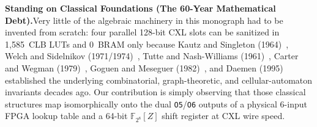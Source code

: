 \documentclass[10pt,twocolumn]{article}
\providecommand{\CoreClbLuts}{1,585}
\providecommand{\CorePhysicalLUTs}{\CoreClbLuts}
\theoremstyle{spectralthm}
\begin{document}
\par\medskip\noindent\textbf{Standing on Classical Foundations (The 60-Year Mathematical Debt).}\;Very little of the algebraic machinery in this monograph had to be invented from scratch: four parallel 128-bit CXL slots can be sanitized in \CorePhysicalLUTs\ CLB LUTs and 0~BRAM only because Kautz and Singleton (1964)~\cite{kautz1964nonrandom}, Welch and Sidelnikov (1971/1974)~\cite{welch1974lower}, Tutte and Nash-Williams (1961)~\cite{tutte1961problem,nashwilliams1961edge}, Carter and Wegman (1979)~\cite{carter1979universal}, Goguen and Meseguer (1982)~\cite{goguen1982security}, and Daemen (1995)~\cite{daemen1995cipher} established the underlying combinatorial, graph-theoretic, and cellular-automaton invariants decades ago. Our contribution is simply observing that those classical structures map isomorphically onto the dual \texttt{O5}/\texttt{O6} outputs of a physical 6-input FPGA lookup table and a 64-bit $\mathbb{F}_{2^8}[Z]$ shift register at CXL wire speed.
\end{document}
